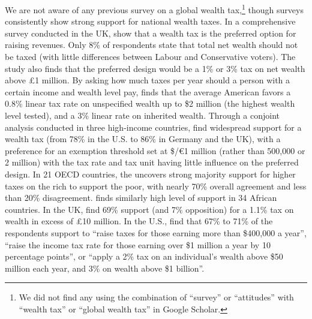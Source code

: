 We are not aware of any previous survey on a global wealth tax,\footnote{We did not find any using the combination of ``survey'' or ``attitudes'' with ``wealth tax'' or ``global wealth tax'' in Google Scholar.} though surveys consistently show strong support for national wealth taxes. 
In a comprehensive survey conducted in the UK,  show that a wealth tax is the preferred option for raising revenues. Only 8\% of respondents state that total net wealth should not be taxed (with little differences between Labour and Conservative voters). The study also finds that the preferred design would be a 1\% or 3\% tax on net wealth above £1 million. 
By asking how much taxes per year should a person with a certain income and wealth level pay,  finds that the average American favors a 0.8\% linear tax rate on unspecified wealth up to \$2 million (the highest wealth level tested), and a 3\% linear rate on inherited wealth. %
Through a conjoint analysis conducted in three high-income countries,  find widespread support for a wealth tax (from 78\% in the U.S. to 86\% in Germany and the UK), with a preference for an exemption threshold set at \$/\euro{}1 million (rather than 500,000 or 2 million) with the tax rate and tax unit having little influence on the preferred design. 
In 21 OECD countries, the  uncovers strong majority support for higher taxes on the rich to support the poor, with nearly 70\% overall agreement and less than 20\% disagreement.  finds similarly high level of support in 34 African countries. 
In the UK,  find 69\% support (and 7\% opposition) for a 1.1\% tax on wealth in excess of £10 million. 
In the U.S.,  find that 67\% to 71\% of the respondents support to ``raise taxes for those earning more than \$400,000 a year'', ``raise the income tax rate for those earning over \$1 million a year by 10 percentage points'', or ``apply a 2\% tax on an individual's wealth above \$50 million each year, and 3\% on wealth above \$1 billion''.


